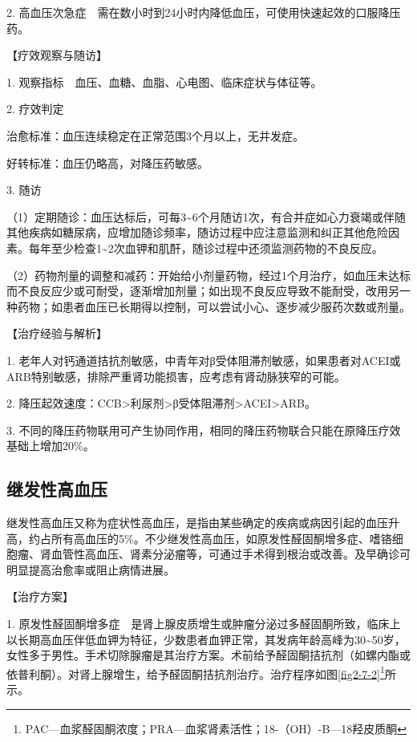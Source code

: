 2.
高血压次急症　需在数小时到24小时内降低血压，可使用快速起效的口服降压药。

【疗效观察与随访】

1. 观察指标　血压、血糖、血脂、心电图、临床症状与体征等。

2. 疗效判定

治愈标准：血压连续稳定在正常范围3个月以上，无并发症。

好转标准：血压仍略高，对降压药敏感。

3. 随访

（1）定期随诊：血压达标后，可每3\textasciitilde{}6个月随访1次，有合并症如心力衰竭或伴随其他疾病如糖尿病，应增加随诊频率，随访过程中应注意监测和纠正其他危险因素。每年至少检查1\textasciitilde{}2次血钾和肌酐，随诊过程中还须监测药物的不良反应。

（2）药物剂量的调整和减药：开始给小剂量药物，经过1个月治疗，如血压未达标而不良反应少或可耐受，逐渐增加剂量；如出现不良反应导致不能耐受，改用另一种药物；如患者血压已长期得以控制，可以尝试小心、逐步减少服药次数或剂量。

【治疗经验与解析】

1.
老年人对钙通道拮抗剂敏感，中青年对β受体阻滞剂敏感，如果患者对ACEI或ARB特别敏感，排除严重肾功能损害，应考虑有肾动脉狭窄的可能。

2.
降压起效速度：CCB\textgreater{}利尿剂\textgreater{}β受体阻滞剂\textgreater{}ACEI\textgreater{}ARB。

3.
不同的降压药物联用可产生协同作用，相同的降压药物联合只能在原降压疗效基础上增加20\%。

\subsection{继发性高血压}

继发性高血压又称为症状性高血压，是指由某些确定的疾病或病因引起的血压升高，约占所有高血压的5\%。不少继发性高血压，如原发性醛固酮增多症、嗜铬细胞瘤、肾血管性高血压、肾素分泌瘤等，可通过手术得到根治或改善。及早确诊可明显提高治愈率或阻止病情进展。

【治疗方案】

1.
原发性醛固酮增多症　是肾上腺皮质增生或肿瘤分泌过多醛固酮所致，临床上以长期高血压伴低血钾为特征，少数患者血钾正常，其发病年龄高峰为30\textasciitilde{}50岁，女性多于男性。手术切除腺瘤是其治疗方案。术前给予醛固酮拮抗剂（如螺内酯或依普利酮）。对肾上腺增生，给予醛固酮拮抗剂治疗。治疗程序如图\ref{fig2-7-2}\footnote{PAC---血浆醛固酮浓度；PRA---血浆肾素活性；18-（OH）-B---18羟皮质酮}所示。

